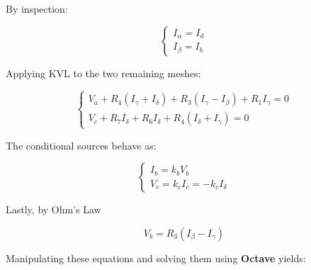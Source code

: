 \newpage

By inspection:

\begin{equation}
  \begin{cases}
    I_{\alpha} = I_d \\
    I_{\beta} = I_b
  \end{cases}
\end{equation}

Applying KVL to the two remaining meshes:

\begin{equation}
  \begin{cases}
    V_a + R_4 (I_\gamma + I_\delta) + R_3 (I_\gamma - I_\beta) + R_1 I_\gamma = 0 \\
    V_c + R_7 I_\delta + R_6 I_\delta + R_4 (I_\delta + I_\gamma) = 0
  \end{cases}
\end{equation}

The conditional sources behave as:

\begin{equation}
  \begin{cases}
  I_b = k_b V_b \\
  V_c = k_c I_c = - k_c I_\delta
  \end{cases}
\end{equation}

Lastly, by Ohm's Law

\begin{equation}
  V_b = R_3 (I_\beta - I_\gamma)
\end{equation}

Manipulating these equations and solving them using {\bf Octave} yields:


